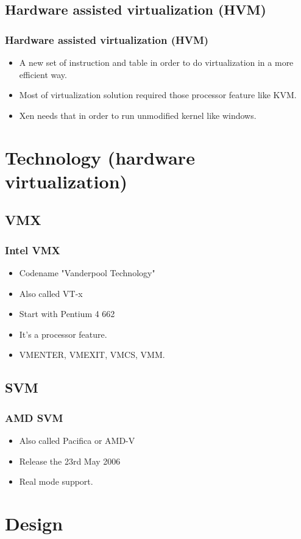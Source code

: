 \subsection{Hardware assisted virtualization (HVM)}
\begin{frame}
\frametitle{Hardware assisted virtualization (HVM)}
\begin{itemize}
\item A new set of instruction and table in order to do virtualization in a more efficient way.
\item Most of virtualization solution required those processor feature like KVM.
\item Xen needs that in order to run unmodified kernel like windows.
\end{itemize}
\end{frame}

\section{Technology (hardware virtualization)}
\subsection{VMX}
\begin{frame}
\frametitle{Intel VMX}
\begin{itemize}
\item Codename "Vanderpool Technology"
\item Also called VT-x
\item Start with Pentium 4 662
\item It's a processor feature.
\item VMENTER, VMEXIT, VMCS, VMM.
\end{itemize}
\end{frame}
\subsection{SVM}
\begin{frame}
\frametitle{AMD SVM}
\begin{itemize}
\item Also called Pacifica or AMD-V
\item Release the 23rd May 2006
\item Real mode support.
\end{itemize}
\end{frame}

\section{Design}

